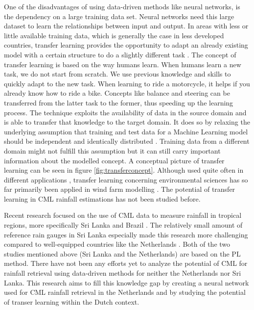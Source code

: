 \documentclass[twocolumn, 10pt, a4paper]{memoir}
\begin{document}
One of the disadvantages of using data-driven methods like neural networks, is the dependency on a large training data set. Neural networks need this large dataset to learn the relationships between input and output. In areas with less or little available training data, which is generally the case in less developed countries, transfer learning provides the opportunity to adapt an already existing model with a certain structure to do a slightly different task \cite{TanYear}. The concept of transfer learning is based on the way humans learn. When humans learn a new task, we do not start from scratch. We use previous knowledge and skills to quickly adapt to the new task. When learning to ride a motorcycle, it helps if you already know how to ride a bike. Concepts like balance and steering can be transferred from the latter task to the former, thus speeding up the learning process. 
The technique exploits the availability of data in the source domain and is able to transfer that knowledge to the target domain. It does so by relaxing the underlying assumption that training and test data for a Machine Learning model should be independent and identically distributed \cite{Weiss2016}. Training data from a different domain might not fulfill this assumption but it can still carry important information about the modelled concept. A conceptual picture of transfer learning can be seen in figure \ref{fig:transferconcept}. Although used quite often in different applications \cite{Zhuang2021}, transfer learning concerning environmental sciences has so far primarily been applied in wind farm modelling . The potential of transfer learning in CML rainfall estimations has not been studied before. 

Recent research focused on the use of CML data to measure rainfall in tropical regions, more specifically Sri Lanka  and Brazil . The relatively small amount of reference rain gauges in Sri Lanka especially made this research more challenging compared to well-equipped countries like the Netherlands . Both of the two studies mentioned above (Sri Lanka and the Netherlands) are based on the PL method. There have not been any efforts yet to analyze the potential of CML for rainfall retrieval using data-driven methods for neither the Netherlands nor Sri Lanka. This research aims to fill this knowledge gap by creating a neural network used for CML rainfall retrieval in the Netherlands and by studying the potential of transer learning within the Dutch context.
\end{document}
